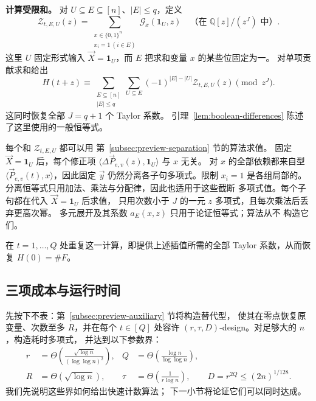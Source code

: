 \documentclass[11pt,reqno]{amsart}
\numberwithin{equation}{section}
\theoremstyle{definition}\newtheorem{definition}[theorem]{定义}
\theoremstyle{remark}\newtheorem{remark}[theorem]{注}
\renewcommand{\le}{\leqslant}
\begin{document}
\smallskip\noindent
\textbf{计算受限和。}
对 $U\subseteq E\subseteq[n]$、$|E|\le q$，定义
\begin{equation}\label{eq:outline-restricted-taylor-sum}
 \mathcal Z_{t,E,U}(z)=
 \sum_{\substack{x\in\{0,1\}^n\\x_i=1\ (i\in E)}}
                    \mathcal G_x(\mathbf1_U,z)
       \quad\text{（在 }\mathbb Q[z]/(z^J)\text{ 中）}.
\end{equation}
这里 $U$ 固定形式输入 $\vec X=\mathbf1_U$，而 $E$ 把求和变量
$x$ 的某些位固定为一。
对单项贡献求和给出
\begin{equation}\label{eq:outline-taylor-recovery}
 H(t+z)\equiv
 \sum_{\substack{E\subseteq[n]\\|E|\le q}}
       \sum_{U\subseteq E}(-1)^{|E|-|U|}
                         \mathcal Z_{t,E,U}(z)\pmod{z^J}.
\end{equation}
这同时恢复全部 $J=q+1$ 个 Taylor 系数。
引理~\ref{lem:boolean-differences} 陈述了这里使用的一般恒等式。

每个和 $\mathcal Z_{t,E,U}$ 都可以用
第~\ref{subsec:preview-separation} 节的算法求值。
固定 $\vec X=\mathbf1_U$ 后，每个修正项
$\langle\Delta\vec P_{e,v}(z),\mathbf1_U\rangle$ 与 $x$ 无关。
对 $x$ 的全部依赖都来自型
$\langle\vec P_{e,v}(t),x\rangle$，因此固定 $\vec y$
仍然分离各子句多项式。限制 $x_i=1$ 是各组局部的。
分离恒等式只用加法、乘法与分配律，因此也适用于这些截断
多项式值。每个子句都在代入 $\vec X=\mathbf1_U$ 后求值，
只用次数小于 $J$ 的一元 $z$ 多项式，且每次乘法后丢弃更高次幂。
多元展开及其系数 $a_E(x,z)$ 只用于论证恒等式；算法从不
构造它们。

在 $t=1,\ldots,Q$ 处重复这一计算，即提供上述插值所需的全部
Taylor 系数，从而恢复 $H(0)=\#F$。
\subsection{三项成本与运行时间}
\label{subsec:preview-parameters}
先按下不表：第~\ref{subsec:preview-auxiliary} 节将构造替代型，
使其在零点恢复原变量、次数至多 $R$，并在每个 $t\in[Q]$
处容许 $(r,\tau,D)$-design。对足够大的 $n$，构造耗时多项式，
并达到以下参数界：
\begin{equation}\label{eq:overview-parameter-bounds}
 \begin{aligned}
 r&=\Theta\!\left(\frac{\sqrt{\log n}}{(\log\log n)^2}\right),
 &Q&=\Theta\!\left(\frac{\log n}{\log\log n}\right),\\
 R&=\Theta(\sqrt{\log n}),
 &\tau&=\Theta\!\left(\frac1{r\log n}\right),\qquad
 D=r^{2Q}\le(2n)^{1/128}.
 \end{aligned}
\end{equation}
我们先说明这些界如何给出快速计数算法；
下一小节将论证它们可以同时达成。
\end{document}
